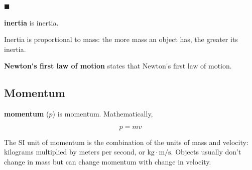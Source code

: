 \documentclass[dvipsnames]{article}
\begin{document}
\hfill $\blacksquare$

\textbf{\Gls{inertia}} is \glsdesc{inertia}. 

Inertia is proportional to mass: the more mass an object has, the greater its inertia. 

\textbf{\gls{Newton's first law of motion}} states that \glsdesc{Newton's first law of motion}.




\subsection{Momentum}


\textbf{\Gls{momentum}} ($p$) is \glsdesc{momentum}. Mathematically, 

\begin{equation}
    p = mv
\end{equation}

The SI unit of momentum is the combination of the units of mass and velocity: kilograms multiplied by meters per second, or $\mathrm{kg\cdot m/s}$. Objects usually don't change in mass but can change momentum with change in velocity. 
\end{document}
